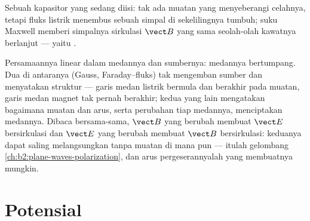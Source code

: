 \begin{omfigure}

{\small Sebuah kapasitor yang sedang diisi: tak ada muatan yang menyeberangi celahnya, tetapi
fluks listrik menembus sebuah simpal di sekelilingnya tumbuh; suku Maxwell memberi
simpalnya sirkulasi $\vect B$ yang sama seolah-olah kawatnya berlanjut ---
yaitu .}
\end{omfigure}

\begin{remark}\label{rem:b2:maxwell-equations:linearity}
Persamaannya linear dalam medannya dan sumbernya: medannya
bertumpang. Dua di antaranya (Gauss, Faraday--fluks) tak mengemban sumber dan
menyatakan struktur --- garis medan listrik bermula dan berakhir pada muatan,
garis medan magnet tak pernah berakhir; kedua yang lain mengatakan bagaimana muatan dan
arus, serta perubahan tiap medannya, menciptakan medannya. Dibaca
bersama-sama, $\vect B$ yang berubah membuat $\vect E$ bersirkulasi dan $\vect E$ yang
berubah membuat $\vect B$ bersirkulasi: keduanya dapat saling melangsungkan tanpa
muatan di mana pun --- itulah gelombang
\cref{ch:b2:plane-waves-polarization}, dan arus pergeserannyalah yang
membuatnya mungkin.
\end{remark}

\section{Potensial}

